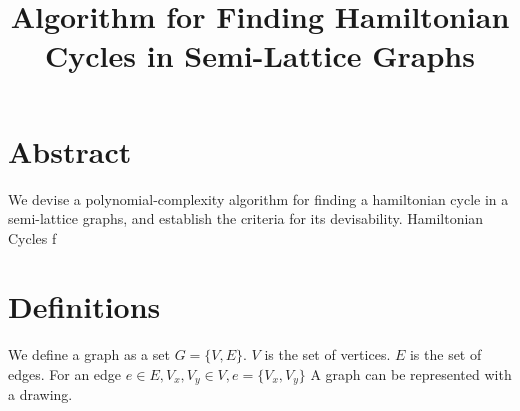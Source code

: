 \documentclass{article}
\title{Algorithm for Finding Hamiltonian Cycles in Semi-Lattice Graphs}
\begin{document}
\date{}
\maketitle

\section{Abstract}
We devise a polynomial-complexity algorithm for finding a hamiltonian cycle in a semi-lattice graphs, and establish the criteria for its devisability. Hamiltonian Cycles f

\section{Definitions}
We define a graph as a set $G=\lbrace V,E \rbrace$. $V$ is the set of vertices. $E$ is the set of edges. For an edge $e\in E, V_{x},V_{y}\in V, e=\lbrace V_{x},V_{y} \rbrace $ A graph can be represented with a drawing. 
\end{document}
